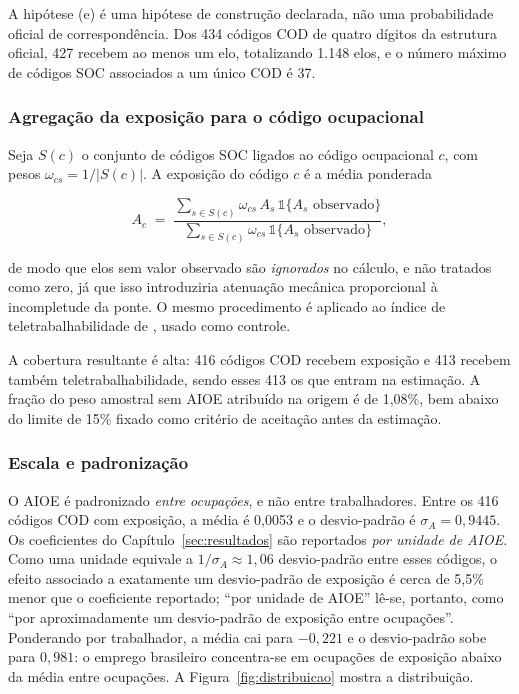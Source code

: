 A hipótese (e) é uma hipótese de construção declarada, não uma probabilidade
oficial de correspondência. Dos 434 códigos COD de quatro dígitos da estrutura
oficial, 427 recebem ao menos um elo, totalizando 1.148 elos, e o número máximo
de códigos SOC associados a um único COD é 37.

\subsubsection{Agregação da exposição para o código ocupacional}

Seja $S(c)$ o conjunto de códigos SOC ligados ao código ocupacional $c$, com
pesos $\omega_{cs} = 1/|S(c)|$. A exposição do código $c$ é a média ponderada

\begin{equation}
  A_c \;=\; \frac{\displaystyle\sum_{s \in S(c)} \omega_{cs} \, A_s \, \mathbb{1}\{A_s \text{ observado}\}}
                 {\displaystyle\sum_{s \in S(c)} \omega_{cs} \, \mathbb{1}\{A_s \text{ observado}\}},
  \label{eq:agregacao_exposicao}
\end{equation}

de modo que elos sem valor observado são \emph{ignorados} no cálculo, e não
tratados como zero, já que isso introduziria atenuação mecânica
proporcional à incompletude da ponte. O mesmo procedimento é aplicado ao índice
de teletrabalhabilidade de , usado como controle.

A cobertura resultante é alta: 416 códigos COD recebem exposição e 413 recebem
também teletrabalhabilidade, sendo esses 413 os que entram na estimação. A
fração do peso amostral sem AIOE atribuído na origem é de 1,08\%, bem abaixo do
limite de 15\% fixado como critério de aceitação antes da estimação.

\subsubsection{Escala e padronização}

O AIOE é padronizado \emph{entre ocupações}, e não entre trabalhadores. Entre os
416 códigos COD com exposição, a média é 0,0053 e o desvio-padrão é $\sigma_A = 0{,}9445$. Os coeficientes do
Capítulo~\ref{sec:resultados} são reportados \emph{por unidade de AIOE}. Como
uma unidade equivale a $1/\sigma_A \approx 1{,}06$ desvio-padrão entre esses
códigos, o efeito associado a exatamente um desvio-padrão de exposição é cerca
de 5,5\% menor que o coeficiente reportado; ``por unidade de AIOE'' lê-se,
portanto, como ``por aproximadamente um desvio-padrão de exposição entre
ocupações''. Ponderando por trabalhador, a média cai para
$-0{,}221$ e o desvio-padrão sobe para $0{,}981$: o emprego brasileiro
concentra-se em ocupações de exposição abaixo da média entre ocupações. A
Figura~\ref{fig:distribuicao} mostra a distribuição.

